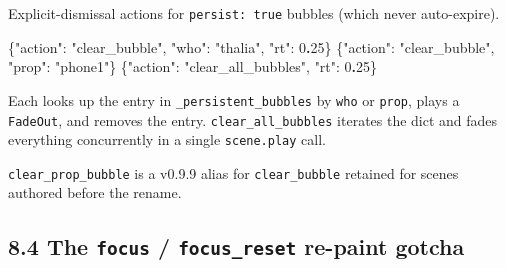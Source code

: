 \documentclass[
  11pt,
]{book}
\newenvironment{Shaded}{}{}
\newcommand{\DataTypeTok}[1]{\textcolor[rgb]{0.56,0.13,0.00}{#1}}
\newcommand{\DecValTok}[1]{\textcolor[rgb]{0.25,0.63,0.44}{#1}}
\newcommand{\ErrorTok}[1]{\textcolor[rgb]{1.00,0.00,0.00}{\textbf{#1}}}
\newcommand{\FunctionTok}[1]{\textcolor[rgb]{0.02,0.16,0.49}{#1}}
\newcommand{\StringTok}[1]{\textcolor[rgb]{0.25,0.44,0.63}{#1}}
\begin{document}
Explicit-dismissal actions for \texttt{persist:\ true} bubbles (which
never auto-expire).

\begin{Shaded}
\begin{Highlighting}[]
\FunctionTok{\{}\DataTypeTok{"action"}\FunctionTok{:} \StringTok{"clear\_bubble"}\FunctionTok{,} \DataTypeTok{"who"}\FunctionTok{:} \StringTok{"thalia"}\FunctionTok{,} \DataTypeTok{"rt"}\FunctionTok{:} \DecValTok{0}\ErrorTok{.}\DecValTok{25}\FunctionTok{\}}
\FunctionTok{\{}\DataTypeTok{"action"}\FunctionTok{:} \StringTok{"clear\_bubble"}\FunctionTok{,} \DataTypeTok{"prop"}\FunctionTok{:} \StringTok{"phone1"}\FunctionTok{\}}
\FunctionTok{\{}\DataTypeTok{"action"}\FunctionTok{:} \StringTok{"clear\_all\_bubbles"}\FunctionTok{,} \DataTypeTok{"rt"}\FunctionTok{:} \DecValTok{0}\ErrorTok{.}\DecValTok{25}\FunctionTok{\}}
\end{Highlighting}
\end{Shaded}

Each looks up the entry in \texttt{\_persistent\_bubbles} by
\texttt{who} or \texttt{prop}, plays a \texttt{FadeOut}, and removes the
entry. \texttt{clear\_all\_bubbles} iterates the dict and fades
everything concurrently in a single \texttt{scene.play} call.

\texttt{clear\_prop\_bubble} is a v0.9.9 alias for
\texttt{clear\_bubble} retained for scenes authored before the rename.


\subsection{\texorpdfstring{8.4 The \texttt{focus} / \texttt{focus\_reset}
re-paint gotcha}{8.4 The focus / focus\_reset re-paint
gotcha}}\label{the-focus_reset-overlay-gotcha}
\end{document}
